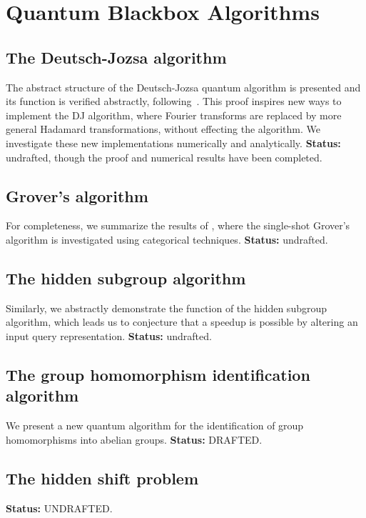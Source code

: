 \chapter{Quantum Blackbox Algorithms}

\todo{\chapabstract{}}

\section{The Deutsch-Jozsa algorithm}
The abstract structure of the Deutsch-Jozsa quantum algorithm is presented and its function is verified abstractly, following~\cite{vicary-tqa}. This proof inspires new ways to implement the DJ algorithm, where Fourier transforms are replaced by more general Hadamard transformations, without effecting the algorithm. We investigate these new implementations numerically and analytically. {\bf Status:} undrafted, though the proof and numerical results have been completed.

\section{Grover's algorithm}
For completeness, we summarize the results of \cite{vicary-tqa}, where the single-shot Grover's algorithm is investigated using categorical techniques. {\bf Status:} undrafted.

\section{The hidden subgroup algorithm}
Similarly, we abstractly demonstrate the function of the hidden subgroup algorithm, which leads us to conjecture that a speedup is possible by altering an input query representation. {\bf Status:} undrafted.

\section{\color{blue} The group homomorphism identification algorithm}
We present a new quantum algorithm for the identification of group homomorphisms into abelian groups. {\bf Status:} DRAFTED.

\section{\color{blue} The hidden shift problem}
{\bf Status:} UNDRAFTED.
